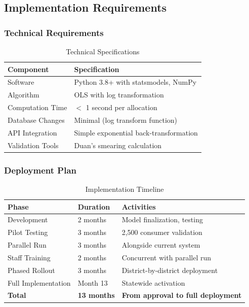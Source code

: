 \subsection{Implementation Requirements}

\subsubsection{Technical Requirements}

\begin{table}[h]
\centering
\caption{Technical Specifications}
\begin{tabular}{ll}
\toprule
\textbf{Component} & \textbf{Specification} \\
\midrule
Software & Python 3.8+ with statsmodels, NumPy \\
Algorithm & OLS with log transformation \\
Computation Time & $<$ 1 second per allocation \\
Database Changes & Minimal (log transform function) \\
API Integration & Simple exponential back-transformation \\
Validation Tools & Duan's smearing calculation \\
\bottomrule
\end{tabular}
\end{table}

\subsubsection{Deployment Plan}

\begin{table}[h]
\centering
\caption{Implementation Timeline}
\begin{tabular}{lll}
\toprule
\textbf{Phase} & \textbf{Duration} & \textbf{Activities} \\
\midrule
Development & 2 months & Model finalization, testing \\
Pilot Testing & 3 months & 2,500 consumer validation \\
Parallel Run & 3 months & Alongside current system \\
Staff Training & 2 months & Concurrent with parallel run \\
Phased Rollout & 3 months & District-by-district deployment \\
Full Implementation & Month 13 & Statewide activation \\
\midrule
\textbf{Total} & \textbf{13 months} & \textbf{From approval to full deployment} \\
\bottomrule
\end{tabular}
\end{table}

